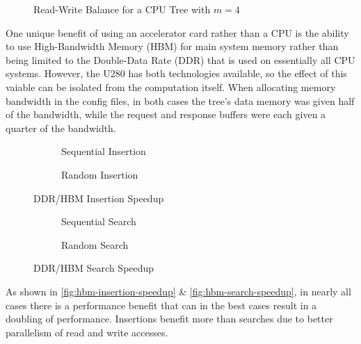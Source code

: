 
\begin{figure}[H]
	\centering
	
	\caption{Read-Write Balance for a CPU Tree with $m=4$}
	\label{fig:rw-balance}
\end{figure}



One unique benefit of using an accelerator card rather than a CPU is the ability
to use High-Bandwidth Memory (HBM) for main system memory rather than being
limited to the Double-Data Rate (DDR) that is used on essentially all CPU
systems. However, the U280 has both technologies available, so the effect of
this vaiable can be isolated from the computation itself. When allocating memory
bandwidth in the config files, in both cases the tree's data memory was given
half of the bandwidth, while the request and response buffers were each given a
quarter of the bandwidth.

\begin{figure}[H]
	\centering
	\begin{subfigure}{7.5cm}
		\centering
		
		\caption{Sequential Insertion}
		\label{fig:hbm-speedup-sequential-insertion}
	\end{subfigure}
	\begin{subfigure}{7.5cm}
		\centering
		
		\caption{Random Insertion}
		\label{fig:hbm-speedup-random-insertion}
	\end{subfigure}
	\caption{DDR/HBM Insertion Speedup}
	\label{fig:hbm-insertion-speedup}
\end{figure}

\begin{figure}[H]
	\centering
	\begin{subfigure}{7.5cm}
		\centering
		
		\caption{Sequential Search}
		\label{fig:hbm-speedup-sequential-search}
	\end{subfigure}
	\begin{subfigure}{7.5cm}
		\centering
		
		\caption{Random Search}
		\label{fig:hbm-speedup-random-search}
	\end{subfigure}
	\caption{DDR/HBM Search Speedup}
	\label{fig:hbm-search-speedup}
\end{figure}

As shown in \autoref{fig:hbm-insertion-speedup} \&
\autoref{fig:hbm-search-speedup}, in nearly all cases there is a performance
benefit that can in the best cases result in a doubling of performance.
Insertions benefit more than searches due to better parallelism of read and
write accesses.


